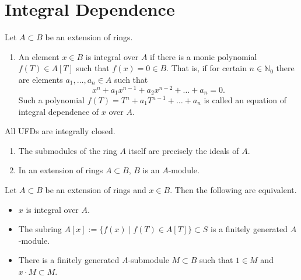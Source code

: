\section{Integral Dependence}
\begin{definition}
    Let \(A \subset B\) be an extension of rings.
    \begin{enumerate}
        \item An element \(x \in B\) is integral over \(A\) if there is a monic polynomial \(f(T) \in A[T]\) such that \(f(x) = 0 \in B\). That is, if for certain \(n \in \mathbb{N}_0\) there are elements \(a_1, \dots, a_n \in A\) such that
        \begin{equation}
            x^n + a_1 x^{n-1} + a_2 x^{n-2} + \dots + a_n = 0.
        \end{equation}
        Such a polynomial \(f(T) = T^n + a_1 T^{n-1} + \dots + a_n\) is called an equation of integral dependence of \(x\) over \(A\).
    \end{enumerate}
\end{definition}
\begin{lemma}
    All UFDs are integrally closed.
\end{lemma}
\begin{definition}[\(A\)-Module]
    
\end{definition}
\begin{remark}
    \begin{enumerate}
        \item The submodules of the ring \(A\) itself are precisely the ideals of \(A\).
        \item In an extension of rings \(A \subset B\), \(B\) is an \(A\)-module.
    \end{enumerate}
\end{remark}
\begin{proposition}
    Let \(A \subset B\) be an extension of rings and \(x \in B\). Then the following are equivalent.
    \begin{itemize}
        \item \(x\) is integral over \(A\).
        \item The subring \(A[x] := \{f(x) \mid f(T) \in A[T]\} \subset S\) is a finitely generated \(A\)-module.
        \item There is a finitely generated \(A\)-submodule \(M \subset B\) such that \(1 \in M\) and \(x \cdot M \subset M\).
    \end{itemize}
\end{proposition}